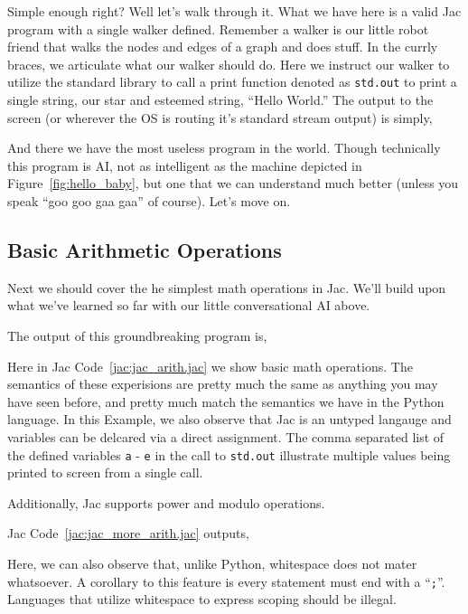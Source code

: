 
Simple enough right? Well let's walk through it. What we have here is a valid Jac program with a single walker defined. Remember a walker is our little robot friend that walks the nodes and edges of a graph and does stuff. In the currly braces, we articulate what our walker should do. Here we instruct our walker to utilize the standard library to call a print function denoted as \texttt{std.out} to print a single string, our star and esteemed string, ``Hello World.'' The output to the screen (or wherever the OS is routing it's standard stream output) is simply,


And there we have the most useless program in the world. Though technically this program is AI, not as intelligent as the machine depicted in Figure~\ref{fig:hello_baby}, but one that we can understand much better (unless you speak ``\gls{goo goo gaa gaa}'' of course). Let's move on.

\subsection{Basic Arithmetic Operations}
Next we should cover the he simplest math operations in Jac. We'll build upon what we've learned so far with our little conversational AI above.


The output of this groundbreaking program is,


Here in Jac Code~\ref{jac:jac_arith.jac} we show basic math operations. The semantics of these experisions are pretty much the same as anything you may have seen before, and pretty much match the semantics we have in the Python language. In this Example, we also observe that Jac is an untyped langauge and variables can be delcared via a direct assignment. The comma separated list of the defined variables \texttt{a} - \texttt{e} in the call to \texttt{std.out} illustrate multiple values being printed to screen from a single call.
\par
Additionally, Jac supports power and modulo operations.


Jac Code~\ref{jac:jac_more_arith.jac} outputs,


Here, we can also observe that, unlike Python, whitespace does not mater whatsoever. A corollary to this feature is every statement must end with a ``\texttt{;}''. Languages that utilize whitespace to express scoping should be illegal.